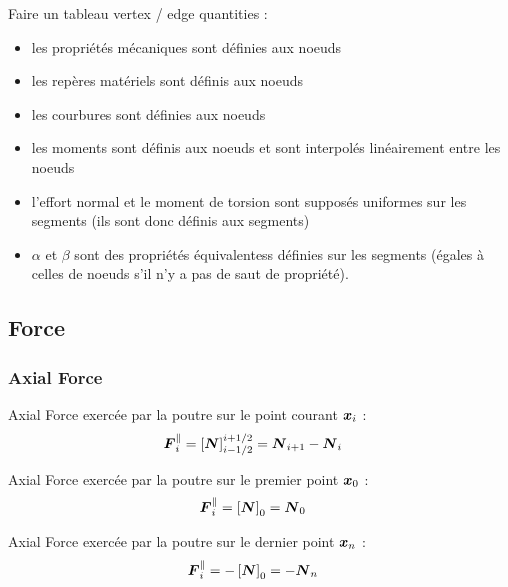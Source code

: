 Faire un tableau vertex / edge quantities :
\begin{itemize}
\item les propriétés mécaniques sont définies aux noeuds
\item les repères matériels sont définis aux noeuds
\item les courbures sont définies aux noeuds
\item les moments sont définis aux noeuds et sont interpolés linéairement entre les noeuds
\item l'effort normal et le moment de torsion sont supposés uniformes sur les segments (ils sont donc définis aux segments)
\item $\alpha$ et $\beta$ sont des propriétés équivalentess définies sur les segments (égales à celles de noeuds s'il n'y a pas de saut de propriété).
\end{itemize}

\subsection{Force}

\subsubsection{Axial Force}

Axial Force exercée par la poutre sur le point courant $\boldsymbol{x}_i$ :
\begin{equation}
	\begin{aligned}
	\boldsymbol{F}_i^{\parallel}
	&= \left[\boldsymbol{N}\right]_{i-1/2}^{i+1/2}
	= \boldsymbol{N}_{i+1} - \boldsymbol{N}_{i}
	\end{aligned}
\end{equation}

Axial Force exercée par la poutre sur le premier point $\boldsymbol{x}_0$ :
\begin{equation}
	\begin{aligned}
	\boldsymbol{F}_i^{\parallel}
	&= \left[\boldsymbol{N}\right]_{0}
	= \boldsymbol{N}_{0}
	\end{aligned}
\end{equation}

Axial Force exercée par la poutre sur le dernier point $\boldsymbol{x}_n$ :
\begin{equation}
	\begin{aligned}
	\boldsymbol{F}_i^{\parallel}
	&= -\left[\boldsymbol{N}\right]_{0}
	= -\boldsymbol{N}_{n}
	\end{aligned}
\end{equation}



